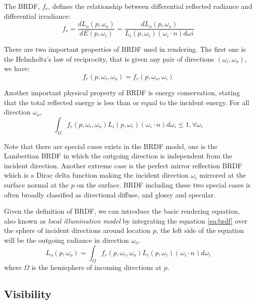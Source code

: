 The BRDF, \(f_{r}\), defines the relationship between differential reflected radiance and differential irradiance:
\begin{equation}
f_{r} = \frac{dL_{o}(p, \omega_{o})}{dE(p, \omega_{i})} = \frac{dL_{o}(p, \omega_{o})}{L_{i}(p, \omega_{i})(\omega_{i} \cdot n)d\omega{i}}
\label{eq:brdf}
\end{equation}

There are two important properties of BRDF used in rendering. The first one is the Helmholtz's law of reciprocity, that is given any pair of directions \( (\omega_{i}, \omega_{o} ) \), we have:
\begin{equation}
f_{r}(p, \omega_{i}, \omega_{o}) = f_r(p, \omega_{o}, \omega_{i})
\end{equation}

Another important physical property of BRDF is energy conservation, stating that the total reflected energy is less than or equal to the incident energy. For all direction \( \omega_{o} \),
\begin{equation}
 \int_{\Omega}f_{r}(p, \omega_{i}, \omega_{o})L_{i}(p, \omega_{i})(\omega_{i} \cdot n)d\omega_{i} \leq 1 , \forall \omega_{i}
\end{equation}

Note that there are special cases exists in the BRDF model, one is the \emph{}{Lambertian} BRDF in which the outgoing direction is independent from the incident direction. Another extreme case is the perfect mirror reflection BRDF which is a Dirac delta function making the incident direction \(\omega_{i}\) mirrored at the surface normal at the \(p\) on the surface. BRDF including these two special cases is often broadly classified as directional diffuse, and glossy and specular.

Given the definition of BRDF, we can introduce the basic rendering equation, also known as \emph{local illumination model} by integrating the equation \ref{eq:brdf} over the sphere of incident directions around location \(p\), the left side of the equation will be the outgoing radiance in direction \(\omega_{o}\).
\begin{equation}
L_{o}(p, \omega_{o}) = \int_{\Omega}f_{r}(p, \omega_{i}, \omega_{o})L_{i}(p, \omega_{i})(\omega_{i} \cdot n)d\omega_{i}
\label{eq:local_render_equation}
\end{equation}
where \(\Omega\) is the hemisphere of incoming directions at \(p\).

\subsection{Visibility}

